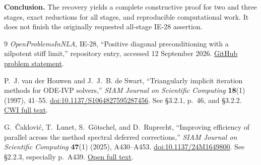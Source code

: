 \documentclass[11pt]{article}
\theoremstyle{remark}
\begin{document}
\medskip
\textbf{Conclusion.} The recovery yields a complete constructive proof for two
and three stages, exact reductions for all stages, and reproducible computational
work. It does not finish the originally requested all-stage IE-28 assertion.

\begin{thebibliography}{9}
\emph{OpenProblemsInNLA}, IE-28, ``Positive diagonal preconditioning with a
nilpotent stiff limit,'' repository entry, accessed 12 September 2026.
\href{https://github.com/ajt60gaibb/OpenProblemsInNLA/blob/main/linear-systems-and-elimination/IE-28/README.md}{GitHub problem statement}.

P.~J. van der Houwen and J.~J.~B. de Swart,
``Triangularly implicit iteration methods for ODE-IVP solvers,''
\emph{SIAM Journal on Scientific Computing} \textbf{18}(1) (1997), 41--55.
\href{https://doi.org/10.1137/S1064827595287456}{doi:10.1137/S1064827595287456}.
See \S3.2.1, p.~46, and \S3.2.2.
\href{https://ir.cwi.nl/pub/2191/2191D.pdf}{CWI full text}.

G.~\v{C}aklovi\'{c}, T.~Lunet, S.~G\"otschel, and D.~Ruprecht,
``Improving efficiency of parallel across the method spectral deferred
corrections,'' \emph{SIAM Journal on Scientific Computing}
\textbf{47}(1) (2025), A430--A453.
\href{https://doi.org/10.1137/24M1649800}{doi:10.1137/24M1649800}.
See \S2.2.3, especially p.~A439.
\href{https://d-nb.info/1363153935/34}{Open full text}.
\end{thebibliography}
\end{document}
